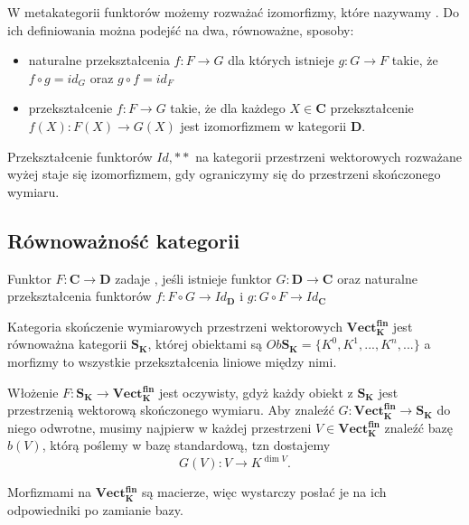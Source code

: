 \begin{definition}
  W metakategorii funktorów możemy rozważać izomorfizmy, które nazywamy . Do ich definiowania można podejść na dwa, równoważne, sposoby:
  \begin{itemize}
    \item naturalne przekształcenia $f:F\to G$ dla których istnieje $g:G\to F$ takie, że $f\circ g=id_G$ oraz $g\circ f=id_F$
    \item przekształcenie $f:F\to G$ takie, że dla każdego $X\in\mathbf{C}$ przekształcenie $f(X):F(X)\to G(X)$ jest izomorfizmem w kategorii $\mathbf{D}$.
  \end{itemize}
\end{definition}

\begin{example}
  \item Przekształcenie funktorów $Id, **$ na kategorii przestrzeni wektorowych rozważane wyżej staje się izomorfizmem, gdy ograniczymy się do przestrzeni skończonego wymiaru.
\end{example}

\subsection{Równoważność kategorii}

\begin{definition}
  Funktor $F:\mathbf{C}\to\mathbf{D}$ zadaje , jeśli istnieje funktor $G:\mathbf{D}\to\mathbf{C}$ oraz naturalne przekształcenia funktorów $f:F\circ G\to Id_{\mathbf{D}}$ i $g:G\circ F\to Id_{\mathbf{C}}$
\end{definition}

\begin{example}
\item Kategoria skończenie wymiarowych przestrzeni wektorowych $\mathbf{Vect_K^{fin}}$ jest równoważna kategorii $\mathbf{S_K}$, której obiektami są $Ob\mathbf{S_K}=\{K^0,K^1,...,K^n,...\}$ a morfizmy to wszystkie przekształcenia liniowe między nimi.

  Włożenie $F:\mathbf{S_K}\to \mathbf{Vect_K^{fin}}$ jest oczywisty, gdyż każdy obiekt z $\mathbf{S_K}$ jest przestrzenią wektorową skończonego wymiaru. Aby znaleźć $G:\mathbf{Vect_K^{fin}}\to \mathbf{S_K}$ do niego odwrotne, musimy najpierw w każdej przestrzeni $V\in\mathbf{Vect_K^{fin}}$ znaleźć bazę $b(V)$, którą poślemy w bazę standardową, tzn dostajemy
  $$G(V):V\to K^{\dim V}.$$

  Morfizmami na $\mathbf{Vect_K^{fin}}$ są macierze, więc wystarczy posłać je na ich odpowiedniki po zamianie bazy.
\end{example}

